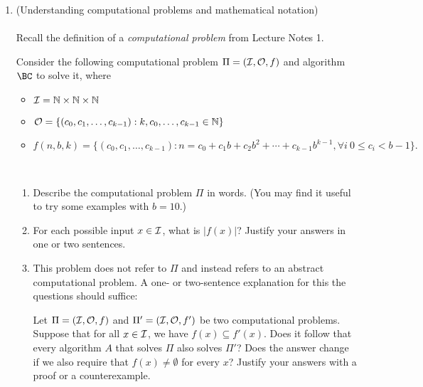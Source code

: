 \documentclass[11pt]{article}
\begin{document}
\begin{enumerate}
\begin{enumerate}
    \end{enumerate}
    
    \newpage
    
    \item (Understanding computational problems and mathematical notation)\\\\
    Recall the definition of a {\em computational problem} from Lecture Notes 1.  

 
    Consider the following computational problem $\Pi=(\mathcal{I},\mathcal{O},f)$ and algorithm $\BC$ to solve it, where
    \begin{itemize}                                
    \item $\mathcal{I} = \mathbb{N}\times\mathbb{N}\times \mathbb{N}$ 
    \item $\mathcal{O} = \{(c_0,c_1,\ldots,c_{k-1}) : k,c_0,\ldots,c_{k-1}\in \mathbb{N}\}$
    \item $f(n,b,k) = \{ (c_0,c_1,\ldots,c_{k-1}) : n=c_0+c_1b+c_2b^2+\cdots+c_{k-1}b^{k-1}, \forall i\ 0\leq c_i< b-1\}.$ 
    \end{itemize}

    
\begin{algorithm}[H]
    \\
    {

    \lElse{\Return{$\bot$}}}
\end{algorithm}


\begin{enumerate}
\item Describe the computational problem $\Pi$ in words.  (You may find it useful to try some examples with $b=10$.)
\item For each possible input $x\in \mathcal{I}$, what is $|f(x)|$?  Justify your answers in one or two sentences.


\item This problem does not refer to $\Pi$ and instead refers to an abstract computational problem. A one- or two-sentence explanation for this the questions should suffice:


Let $\Pi=(\mathcal{I},\mathcal{O},f)$ and $\Pi'=(\mathcal{I},\mathcal{O},f')$ be two computational problems.  Suppose that for all $x\in \mathcal{I}$, we have $f(x)\subseteq f'(x)$.  Does it follow that every algorithm $A$ that solves $\Pi$ also solves $\Pi'$?    Does the answer change if we also require that $f(x)\neq \emptyset$ for every $x$? Justify your answers with a proof or a counterexample.




\end{enumerate}
\end{enumerate}
\end{document}
